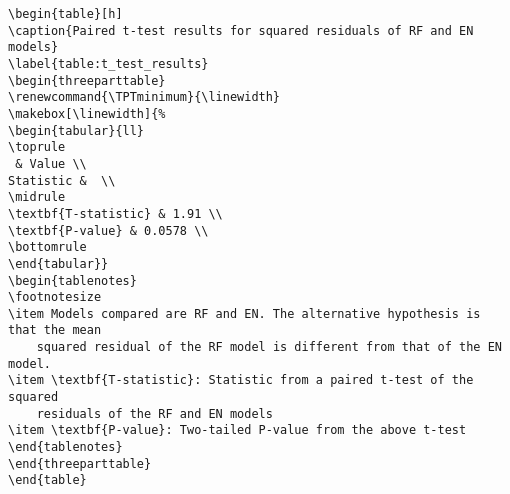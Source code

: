 \documentclass[11pt]{article}
\begin{document}
\begin{Verbatim}[tabsize=4]
\begin{table}[h]
\caption{Paired t-test results for squared residuals of RF and EN models}
\label{table:t_test_results}
\begin{threeparttable}
\renewcommand{\TPTminimum}{\linewidth}
\makebox[\linewidth]{%
\begin{tabular}{ll}
\toprule
 & Value \\
Statistic &  \\
\midrule
\textbf{T-statistic} & 1.91 \\
\textbf{P-value} & 0.0578 \\
\bottomrule
\end{tabular}}
\begin{tablenotes}
\footnotesize
\item Models compared are RF and EN. The alternative hypothesis is that the mean
	squared residual of the RF model is different from that of the EN model.
\item \textbf{T-statistic}: Statistic from a paired t-test of the squared
	residuals of the RF and EN models
\item \textbf{P-value}: Two-tailed P-value from the above t-test
\end{tablenotes}
\end{threeparttable}
\end{table}

\end{Verbatim}
\end{document}
